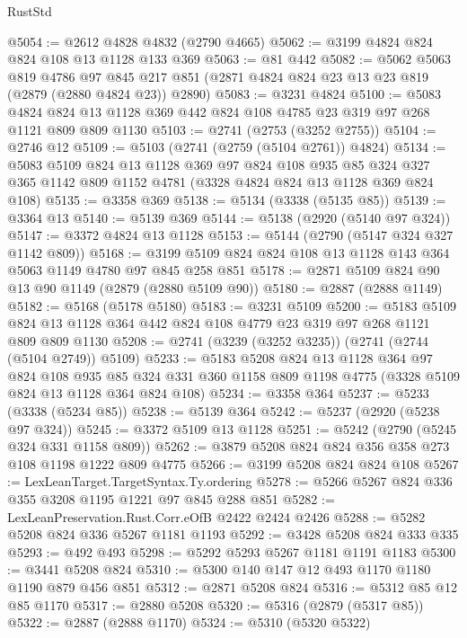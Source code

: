 \begin{lexlean}{RustStd}
\begin{coremodule}
@5054 := @2612 @4828 @4832 (@2790 @4665)
@5062 := @3199 @4824 @824 @824 @108 @13 @1128 @133 @369
@5063 := @81 @442
@5082 := @5062
    @5063
    @819
    @4786
    @97
    @845
    @217
    @851
    (@2871 @4824 @824 @23 @13 @23 @819 (@2879 (@2880 @4824 @23)) @2890)
@5083 := @3231 @4824
@5100 := @5083
    @4824
    @824
    @13
    @1128
    @369
    @442
    @824
    @108
    @4785
    @23
    @319
    @97
    @268
    @1121
    @809
    @809
    @1130
@5103 := @2741 (@2753 (@3252 @2755))
@5104 := @2746 @12
@5109 := @5103 (@2741 (@2759 (@5104 @2761)) @4824)
@5134 := @5083
    @5109
    @824
    @13
    @1128
    @369
    @97
    @824
    @108
    @935
    @85
    @324
    @327
    @365
    @1142
    @809
    @1152
    @4781
    (@3328 @4824 @824 @13 @1128 @369 @824 @108)
@5135 := @3358 @369
@5138 := @5134 (@3338 (@5135 @85))
@5139 := @3364 @13
@5140 := @5139 @369
@5144 := @5138 (@2920 (@5140 @97 @324))
@5147 := @3372 @4824 @13 @1128
@5153 := @5144 (@2790 (@5147 @324 @327 @1142 @809))
@5168 := @3199 @5109 @824 @824 @108 @13 @1128 @143 @364 @5063 @1149 @4780 @97 @845 @258 @851
@5178 := @2871 @5109 @824 @90 @13 @90 @1149 (@2879 (@2880 @5109 @90))
@5180 := @2887 (@2888 @1149)
@5182 := @5168 (@5178 @5180)
@5183 := @3231 @5109
@5200 := @5183
    @5109
    @824
    @13
    @1128
    @364
    @442
    @824
    @108
    @4779
    @23
    @319
    @97
    @268
    @1121
    @809
    @809
    @1130
@5208 := @2741 (@3239 (@3252 @3235)) (@2741 (@2744 (@5104 @2749)) @5109)
@5233 := @5183
    @5208
    @824
    @13
    @1128
    @364
    @97
    @824
    @108
    @935
    @85
    @324
    @331
    @360
    @1158
    @809
    @1198
    @4775
    (@3328 @5109 @824 @13 @1128 @364 @824 @108)
@5234 := @3358 @364
@5237 := @5233 (@3338 (@5234 @85))
@5238 := @5139 @364
@5242 := @5237 (@2920 (@5238 @97 @324))
@5245 := @3372 @5109 @13 @1128
@5251 := @5242 (@2790 (@5245 @324 @331 @1158 @809))
@5262 := @3879 @5208 @824 @824 @356 @358 @273 @108 @1198 @1222 @809 @4775
@5266 := @3199 @5208 @824 @824 @108
@5267 := LexLeanTarget.TargetSyntax.Ty.ordering
@5278 := @5266 @5267 @824 @336 @355 @3208 @1195 @1221 @97 @845 @288 @851
@5282 := LexLeanPreservation.Rust.Corr.eOfB @2422 @2424 @2426
@5288 := @5282 @5208 @824 @336 @5267 @1181 @1193
@5292 := @3428 @5208 @824 @333 @335
@5293 := @492 @493
@5298 := @5292 @5293 @5267 @1181 @1191 @1183
@5300 := @3441 @5208 @824
@5310 := @5300 @140 @147 @12 @493 @1170 @1180 @1190 @879 @456 @851
@5312 := @2871 @5208 @824
@5316 := @5312 @85 @12 @85 @1170
@5317 := @2880 @5208
@5320 := @5316 (@2879 (@5317 @85))
@5322 := @2887 (@2888 @1170)
@5324 := @5310 (@5320 @5322)

\end{coremodule}
\end{lexlean}
